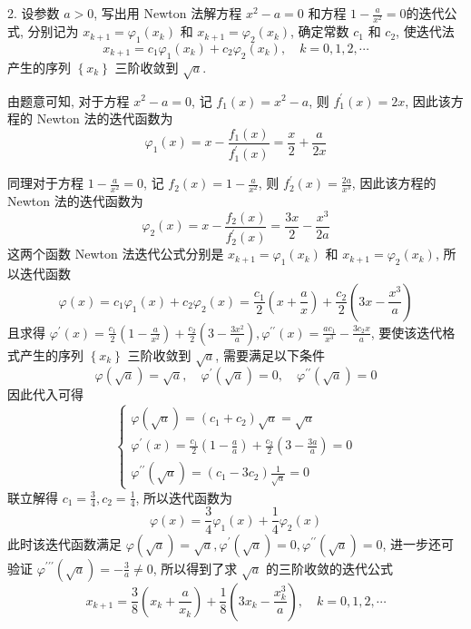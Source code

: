 \begin{tcolorbox}[enhanced,colback=8,colframe=7,breakable,coltitle=green!25!black,title=2024]

2. 设参数 $ a>0 $, 写出用 Newton 法解方程 $ x^{2}-a=0 $ 和方程 $ 1-\frac{a}{x^{2}}=0 $的迭代公式, 分别记为 $ x_{k+1}=\varphi_{1}\left(x_{k}\right) $ 和 $ x_{k+1}=\varphi_{2}\left(x_{k}\right) $, 确定常数 $ c_{1} $ 和 $ c_{2} $, 使迭代法
$$
x_{k+1}=c_{1} \varphi_{1}\left(x_{k}\right)+c_{2} \varphi_{2}\left(x_{k}\right), \quad k=0,1,2, \cdots
$$
产生的序列 $ \left\{x_{k}\right\} $ 三阶收敛到 $ \sqrt{a} $.

 \tcblower
 由题意可知, 对于方程 $ x^{2}-a=0 $, 记 $ f_{1}(x)=x^{2}-a $, 则 $ f_{1}^{\prime}(x)=2 x $, 因此该方程的 Newton 法的迭代函数为
$$
\varphi_{1}(x)=x-\frac{f_{1}(x)}{f_{1}^{\prime}(x)}=\frac{x}{2}+\frac{a}{2 x}
$$

同理对于方程 $ 1-\frac{a}{x^{2}}=0 $, 记 $ f_{2}(x)=1-\frac{a}{x^{2}} $, 则 $ f_{2}^{\prime}(x)=\frac{2 a}{x^{3}} $, 因此该方程的 Newton 法的迭代函数为
$$
\varphi_{2}(x)=x-\frac{f_{2}(x)}{f_{2}^{\prime}(x)}=\frac{3 x}{2}-\frac{x^{3}}{2 a}
$$
这两个函数 Newton 法迭代公式分别是 $ x_{k+1}=\varphi_{1}\left(x_{k}\right) $ 和 $ x_{k+1}=\varphi_{2}\left(x_{k}\right) $, 所以迭代函数
$$
\varphi(x)=c_{1} \varphi_{1}(x)+c_{2} \varphi_{2}(x)=\frac{c_{1}}{2}\left(x+\frac{a}{x}\right)+\frac{c_{2}}{2}\left(3 x-\frac{x^{3}}{a}\right)
$$
且求得 $ \varphi^{\prime}(x)=\frac{c_{1}}{2}\left(1-\frac{a}{x^{2}}\right)+\frac{c_{2}}{2}\left(3-\frac{3 x^{2}}{a}\right), \varphi^{\prime \prime}(x)=\frac{a c_{1}}{x^{3}}-\frac{3 c_{2} x}{a} $, 要使该迭代格式产生的序列 $ \left\{x_{k}\right\} $ 三阶收敛到 $ \sqrt{a} $, 需要满足以下条件
$$
\varphi(\sqrt{a})=\sqrt{a}, \quad \varphi^{\prime}(\sqrt{a})=0, \quad \varphi^{\prime \prime}(\sqrt{a})=0
$$
因此代入可得
$$
\left\{\begin{array}{l}
\varphi(\sqrt{a})=\left(c_{1}+c_{2}\right) \sqrt{a}=\sqrt{a} \\
\varphi^{\prime}(x)=\frac{c_{1}}{2}\left(1-\frac{a}{a}\right)+\frac{c_{2}}{2}\left(3-\frac{3 a}{a}\right)=0 \\
\varphi^{\prime \prime}(\sqrt{a})=\left(c_{1}-3 c_{2}\right) \frac{1}{\sqrt{a}}=0
\end{array}\right.
$$
联立解得 $ c_{1}=\frac{3}{4}, c_{2}=\frac{1}{4} $, 所以迭代函数为
$$
\varphi(x)=\frac{3}{4} \varphi_{1}(x)+\frac{1}{4} \varphi_{2}(x)
$$
此时该迭代函数满足 $ \varphi(\sqrt{a})=\sqrt{a}, \varphi^{\prime}(\sqrt{a})=0, \varphi^{\prime \prime}(\sqrt{a})=0 $, 进一步还可验证 $ \varphi^{\prime \prime \prime}(\sqrt{a})=-\frac{3}{a} \neq 0 $, 所以得到了求 $ \sqrt{a} $ 的三阶收敛的迭代公式
$$
x_{k+1}=\frac{3}{8}\left(x_{k}+\frac{a}{x_{k}}\right)+\frac{1}{8}\left(3 x_{k}-\frac{x_{k}^{3}}{a}\right), \quad k=0,1,2, \cdots
$$
 \end{tcolorbox}


